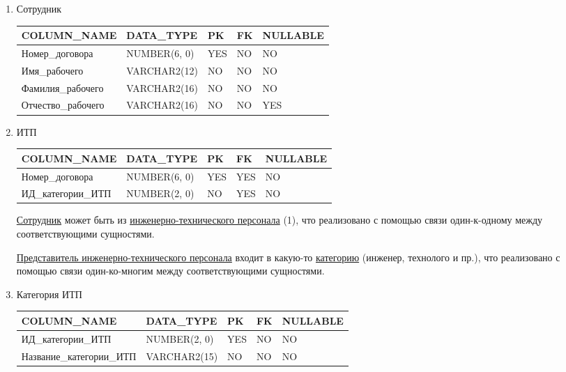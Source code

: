 \begin{enumerate}
    \item{Сотрудник}

    \begin{tabular}{|p{4cm}|p{3cm}|p{1cm}|p{1cm}|p{2cm}|} \hline

        {\bf COLUMN\_NAME} & {\bf DATA\_TYPE} & {\bf PK} & {\bf FK} & {\bf NULLABLE} \\ \hline
        Номер\_договора & NUMBER(6, 0) & YES & NO & NO \\ \hline
        Имя\_рабочего & VARCHAR2(12) & NO & NO & NO \\ \hline
        Фамилия\_рабочего & VARCHAR2(16) & NO & NO & NO \\ \hline
        Отчество\_рабочего & VARCHAR2(16) & NO & NO & YES \\ \hline

    \end{tabular}

    \item{ИТП}

    \begin{tabular}{|p{4cm}|p{3cm}|p{1cm}|p{1cm}|p{2cm}|} \hline

        {\bf COLUMN\_NAME} & {\bf DATA\_TYPE} & {\bf PK} & {\bf FK} & {\bf NULLABLE} \\ \hline
        Номер\_договора & NUMBER(6, 0) & YES & YES & NO \\ \hline
        ИД\_категории\_ИТП & NUMBER(2, 0) & NO & YES & NO \\ \hline

    \end{tabular}

    \underline{Сотрудник} может быть из \underline{инженерно-технического персонала} (1), что реализовано с помощью связи один-к-одному между соответствующими сущностями.

    \underline{Представитель инженерно-технического персонала} входит в какую-то \underline{категорию} (инженер, технолого и пр.), что реализовано с помощью связи один-ко-многим между соответствующими сущностями.

    \item{Категория ИТП}

    \begin{tabular}{|p{4cm}|p{3cm}|p{1cm}|p{1cm}|p{2cm}|} \hline

        {\bf COLUMN\_NAME} & {\bf DATA\_TYPE} & {\bf PK} & {\bf FK} & {\bf NULLABLE} \\ \hline
        ИД\_категории\_ИТП & NUMBER(2, 0) & YES & NO & NO \\ \hline
        Название\_категории\_ИТП & VARCHAR2(15) & NO & NO & NO \\ \hline


\end{tabular}
\end{enumerate}
